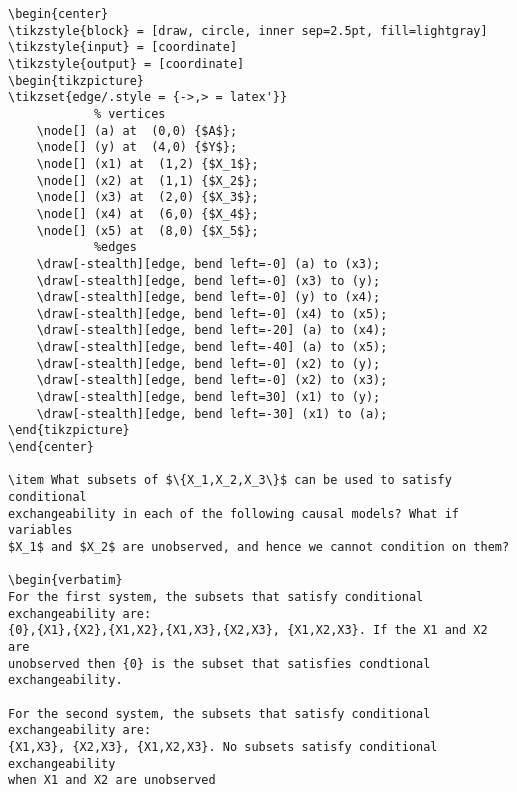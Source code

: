 \documentclass[10pt]{article}
\begin{document}
\begin{enumerate}
\begin{enumerate}[(a)]
\begin{verbatim}
\begin{center}
\tikzstyle{block} = [draw, circle, inner sep=2.5pt, fill=lightgray]
\tikzstyle{input} = [coordinate]
\tikzstyle{output} = [coordinate]
\begin{tikzpicture}
\tikzset{edge/.style = {->,> = latex'}}
            % vertices
	\node[] (a) at  (0,0) {$A$};
	\node[] (y) at  (4,0) {$Y$};
	\node[] (x1) at  (1,2) {$X_1$};
	\node[] (x2) at  (1,1) {$X_2$};
	\node[] (x3) at  (2,0) {$X_3$};
	\node[] (x4) at  (6,0) {$X_4$};
	\node[] (x5) at  (8,0) {$X_5$};
            %edges
	\draw[-stealth][edge, bend left=-0] (a) to (x3);                                                       
	\draw[-stealth][edge, bend left=-0] (x3) to (y);			
	\draw[-stealth][edge, bend left=-0] (y) to (x4);
	\draw[-stealth][edge, bend left=-0] (x4) to (x5);
	\draw[-stealth][edge, bend left=-20] (a) to (x4);
	\draw[-stealth][edge, bend left=-40] (a) to (x5);
	\draw[-stealth][edge, bend left=-0] (x2) to (y);
	\draw[-stealth][edge, bend left=-0] (x2) to (x3);
	\draw[-stealth][edge, bend left=30] (x1) to (y);
	\draw[-stealth][edge, bend left=-30] (x1) to (a);
\end{tikzpicture}
\end{center} 

\item What subsets of $\{X_1,X_2,X_3\}$ can be used to satisfy conditional  
exchangeability in each of the following causal models? What if variables 
$X_1$ and $X_2$ are unobserved, and hence we cannot condition on them? 

\begin{verbatim}
For the first system, the subsets that satisfy conditional exchangeability are:
{0},{X1},{X2},{X1,X2},{X1,X3},{X2,X3}, {X1,X2,X3}. If the X1 and X2 are 
unobserved then {0} is the subset that satisfies condtional exchangeability.

For the second system, the subsets that satisfy conditional exchangeability are: 
{X1,X3}, {X2,X3}, {X1,X2,X3}. No subsets satisfy conditional exchangeability
when X1 and X2 are unobserved

\end{verbatim}


\end{enumerate}
\end{enumerate}
\end{document}
